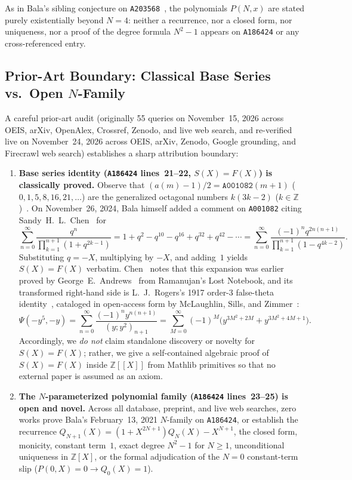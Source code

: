 \documentclass[11pt]{article}
\newcommand{\llbracket}{[\![}
\newcommand{\rrbracket}{]\!]}
\theoremstyle{definition}
\newcommand{\Z}{\mathbb{Z}}
\newcommand{\seq}[1]{\texttt{#1}}
\begin{document}
As in Bala's sibling conjecture on \seq{A203568}~\cite{oeis203568}, the polynomials $P(N, x)$ are stated purely existentially beyond $N = 4$: neither a recurrence, nor a closed form, nor uniqueness, nor a proof of the degree formula $N^2 - 1$ appears on \seq{A186424} or any cross-referenced entry.

\subsection{Prior-Art Boundary: Classical Base Series vs.\ Open \texorpdfstring{$N$}{N}-Family}

A careful prior-art audit (originally 55 queries on November~15, 2026 across OEIS, arXiv, OpenAlex, Crossref, Zenodo, and live web search, and re-verified live on November~24, 2026 across OEIS, arXiv, Zenodo, Google grounding, and Firecrawl web search) establishes a sharp attribution boundary:
\begin{enumerate}\setlength{\itemsep}{2pt}
\item \textbf{Base series identity (\seq{A186424} lines~21--22, $S(X) = F(X)$) is classically proved.}
Observe that $(a(m) - 1)/2 = \seq{A001082}(m + 1)$ ($0, 1, 5, 8, 16, 21, \dots$) are the generalized octagonal numbers $k(3k - 2)$ ($k \in \Z$)~\cite{oeis001082}. On November~26, 2024, Bala himself added a comment on \seq{A001082} citing Sandy~H.~L.\ Chen~\cite[Corollary~3.14, Eqs.~(22)--(23)]{chen2014} for
\[
\sum_{n=0}^{\infty} \frac{q^n}{\prod_{k=1}^{n+1} (1 + q^{2k-1})}
= 1 + q^2 - q^{10} - q^{16} + q^{32} + q^{42} - \cdots
= \sum_{n=0}^{\infty} \frac{(-1)^n q^{2n(n+1)}}{\prod_{k=1}^{n+1} (1 - q^{4k-2})}.
\]
Substituting $q = -X$, multiplying by $-X$, and adding~$1$ yields $S(X) = F(X)$ verbatim. Chen~\cite{chen2014} notes that this expansion was earlier proved by George~E.\ Andrews~\cite{andrews1979} from Ramanujan's Lost Notebook, and its transformed right-hand side is L.~J.\ Rogers's 1917 order-$3$ false-theta identity~\cite[p.~333~(4)]{rogers1917}, cataloged in open-access form by McLaughlin, Sills, and Zimmer~\cite[\S5.3, Eq.~(5.3.2)]{msz2022}:
\[
\Psi(-y^5, -y) = \sum_{n=0}^{\infty} \frac{(-1)^n y^{n(n+1)}}{(y; y^2)_{n+1}}
= \sum_{M=0}^{\infty} (-1)^M \bigl(y^{3M^2 + 2M} + y^{3M^2 + 4M + 1}\bigr).
\]
Accordingly, we \emph{do not} claim standalone discovery or novelty for $S(X) = F(X)$; rather, we give a self-contained algebraic proof of $S(X) = F(X)$ inside $\Z\llbracket X \rrbracket$ from Mathlib primitives so that no external paper is assumed as an axiom.

\item \textbf{The $N$-parameterized polynomial family (\seq{A186424} lines~23--25) is open and novel.}
Across all database, preprint, and live web searches, zero works prove Bala's February~13, 2021 $N$-family on \seq{A186424}, or establish the recurrence $Q_{N+1}(X) = (1 + X^{2N+1}) Q_N(X) - X^{N+1}$, the closed form, monicity, constant term~$1$, exact degree $N^2 - 1$ for $N \ge 1$, unconditional uniqueness in $\Z[X]$, or the formal adjudication of the $N = 0$ constant-term slip ($P(0, X) = 0 \to Q_0(X) = 1$).
\end{enumerate}
\end{document}

